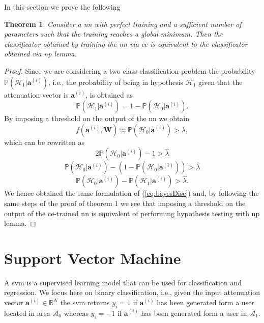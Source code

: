 \documentclass[draftcls,onecolumn,12pt]{IEEEtran}
\newcommand{\ie}{i.e., }
\newtheorem{theorem}{Theorem}
\begin{document}
In this section we prove the following
\begin{theorem}
\label{th:nn_np2}
Consider a \ac{nn} with perfect training and a sufficient number of parameters such that the training reaches a global minimum. Then the classificator obtained by training the \ac{nn} via \ac{ce} is equivalent to the classificator obtained via \ac{np} lemma.
\end{theorem}
\begin{proof}
Since we are considering a two class classification problem the probability $\mathbb{P}(\mathcal{H}_1|\bm{a}^{(i)})$, i.e., the probability of being in hypothesis $\mathcal{H}_1$ given that the attenuation vector is $\bm{a}^{(i)}$, is obtained as
\begin{equation}
    \mathbb{P}(\mathcal{H}_1|\bm{a}^{(i)}) = 1- \mathbb{P}(\mathcal{H}_0|\bm{a}^{(i)}).
\end{equation}
By imposing a threshold on the output of the \ac{nn} we obtain
\begin{equation}
    f(\bm{a}^{(i)},\bm{W}) \approx \mathbb{P}(\mathcal{H}_0|\bm{a}^{(i)}) > \lambda,
\end{equation}
which can be rewritten as
\begin{equation}
    2\mathbb{P}(\mathcal{H}_0|\bm{a}^{(i)})-1 > \hat{\lambda}
\end{equation}
\begin{equation}
    \mathbb{P}(\mathcal{H}_0|\bm{a}^{(i)})-(1-\mathbb{P}(\mathcal{H}_0|\bm{a}^{(i)})) > \hat{\lambda}
\end{equation}
\begin{equation}
    \mathbb{P}(\mathcal{H}_0|\bm{a}^{(i)})-\mathbb{P}(\mathcal{H}_1|\bm{a}^{(i)}) > \hat{\lambda}.
\end{equation}
We hence obtained the same formulation of (\ref{eq:bayesDisc}) and, by following the same steps of the proof of theorem 1 we see that imposing a threshold on the output of the \ac{ce}-trained \ac{nn} is equivalent of performing hypothesis testing with \ac{np} lemma.
\end{proof}
\section{Support Vector Machine}\label{sec:svm}
A \ac{svm} \cite{Bishop2006} is a supervised learning model that can be used for classification and regression. We focus here on binary classification, \ie given the input attenuation vector $\mathbf{a}^{(i)} \in \mathbb{R}^N$ the \ac{svm} returns $y_i = 1$ if $\mathbf{a}^{(i)}$ has been generated form a user located in area $\mathcal{A}_0$ whereas $y_i=-1$ if $\mathbf{a}^{(i)}$ has been generated form a user in $\mathcal{A}_1$.
\end{document}
